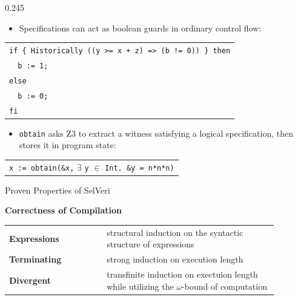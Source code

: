 \documentclass[final]{beamer}
\newcommand{\posterbodyfont}{\fontsize{24}{31}\selectfont}
\begin{document}
\begin{frame}[t,fragile]
\begin{columns}[t,totalwidth=\textwidth]
\begin{column}{0.245\textwidth}
\begin{posterbox}[height=19.5cm,compactboxtitle]{}
{\begin{itemize}
  \item Specifications can act as boolean guards in ordinary control flow:
\end{itemize}
\vspace{-0.2cm}
\begin{mathbox}[left=0.35cm,right=0.35cm,top=0.18cm,bottom=0.18cm]
\begin{center}
\begin{tabular}{l}
\texttt{if \{ Historically ((y >= x + z) => (b != 0)) \} then} \\
\texttt{\ \ b := 1;} \\
\texttt{else} \\
\texttt{\ \ b := 0;} \\
\texttt{fi}
\end{tabular}
\end{center}
\end{mathbox}
\vspace{-0.15cm}
\begin{itemize}
  \item \texttt{obtain} asks Z3 to extract a witness satisfying a logical specification, then stores it in program state:
\end{itemize}
\vspace{-0.2cm}
\begin{mathbox}[left=0.35cm,right=0.35cm,top=0.18cm,bottom=0.18cm]
\begin{center}
\begin{tabular}{l}
\texttt{x := obtain(\&x,} $\exists$ \texttt{y} $\in$ \texttt{Int. \&y = n*n*n)} \\
\end{tabular}
\end{center}
\end{mathbox}
}
\end{posterbox}

\vspace{0.25cm}

\begin{posterbox}[height=25.21cm,compactboxtitle]{Proven Properties of SelVeri}
{\posterbodyfont
\begin{mathbox}[left=0.28cm,right=0.28cm,top=0.24cm,bottom=0.24cm]
\textbf{Correctness of Compilation}
\vspace{0.1cm}
\begin{center}
\renewcommand{\arraystretch}{1.12}
\begin{tabular}{p{0.32\linewidth}p{0.56\linewidth}}
\textbf{Expressions} & structural induction on the syntactic structure of expressions \\
\textbf{Terminating} & strong induction on execution length \\
\textbf{Divergent} & transfinite induction  on exectuion length while utilizing the $\omega$-bound of computation
\end{tabular}
\end{center}
\end{mathbox}

}
\end{posterbox}
\end{column}
\end{columns}
\end{frame}
\end{document}
